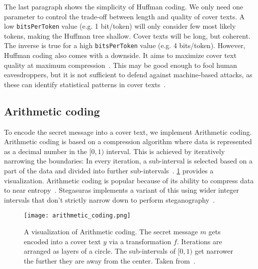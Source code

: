 The last paragraph shows the simplicity of Huffman coding. We only need one parameter to control the trade-off between length and quality of cover texts. A low \lstinline|bitsPerToken| value (e.g. 1 bit/token) will only consider few most likely tokens, making the Huffman tree shallow. Cover texts will be long, but coherent. The inverse is true for a high \lstinline|bitsPerToken| value (e.g. 4 bits/token). However, Huffman coding also comes with a downside. It aims to maximize cover text quality at maximum compression~\cite{zieglerNeuralLinguisticSteganography2019}. This may be good enough to fool human eavesdroppers, but it is not sufficient to defend against machine-based attacks, as these can identify statistical patterns in cover texts~\cite{zieglerNeuralLinguisticSteganography2019}.

\subsection{Arithmetic coding}
\label{sec:arithmeticCoding}
To encode the secret message into a cover text, we implement Arithmetic coding. Arithmetic coding is based on a compression algorithm where data is represented as a decimal number in the $ [0, 1) $ interval. This is achieved by iteratively narrowing the boundaries: In every iteration, a sub-interval is selected based on a part of the data and divided into further sub-intervals~\cite{rissanenArithmeticCoding1979}. \cref{fig:arithmeticCoding} provides a visualization. Arithmetic coding is popular because of its ability to compress data to near entropy~\cite{rissanenArithmeticCoding1979}. Stegasuras implements a variant of this using wider integer intervals that don't strictly narrow down to perform steganography~\cite{zieglerNeuralLinguisticSteganography2019,rubinArithmeticStreamCoding1979}.

\begin{figure}
    \begin{wide}
        \captionsetup{width=\linewidth}
        \texttt{[image: arithmetic\_coding.png]}
		\caption[Arithmetic coding]{A visualization of Arithmetic coding. The secret message $m$ gets encoded into a cover text $y$ via a transformation $f$. Iterations are arranged as layers of a circle. The sub-intervals of $ [0, 1) $ get narrower the further they are away from the center. Taken from~\cite{zieglerNeuralLinguisticSteganography2019}.}
        \label{fig:arithmeticCoding}
    \end{wide}
\end{figure}

